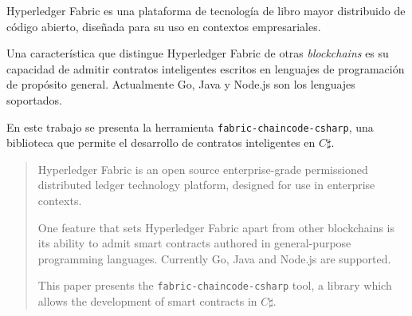 \begin{resumen}
Hyperledger Fabric es una plataforma de tecnología de libro mayor distribuido de código abierto, diseñada para su uso en contextos empresariales.

Una característica que distingue Hyperledger Fabric de otras \textit{blockchains} es su capacidad de admitir contratos inteligentes escritos en lenguajes de programación de propósito general. Actualmente Go, Java y Node.js son los lenguajes soportados.

En este trabajo se presenta la herramienta \texttt{fabric-chaincode-csharp}, una biblioteca que permite el desarrollo de contratos inteligentes en $ C\sharp $.
\end{resumen}

\begin{abstract}
Hyperledger Fabric is an open source enterprise-grade permissioned distributed ledger technology platform, designed for use in enterprise contexts.

One feature that sets Hyperledger Fabric apart from other blockchains is its ability to admit smart contracts authored in general-purpose programming languages. Currently Go, Java and Node.js are supported.

This paper presents the \texttt{fabric-chaincode-csharp} tool, a library which allows the development of smart contracts in $ C\sharp $.
\end{abstract}